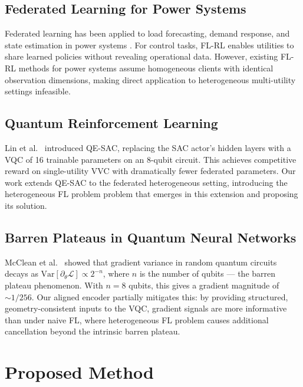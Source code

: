 \documentclass[journal]{IEEEtran}
\begin{document}
\subsection{Federated Learning for Power Systems}

Federated learning has been applied to load forecasting, demand response,
and state estimation in power systems \cite{fedpower2022}.
For control tasks, FL-RL enables utilities to share learned policies without
revealing operational data. However, existing FL-RL methods for power systems
assume homogeneous clients with identical observation dimensions, making
direct application to heterogeneous multi-utility settings infeasible.

\subsection{Quantum Reinforcement Learning}

Lin et al.\ \cite{lin2025qesac} introduced QE-SAC, replacing the SAC actor's
hidden layers with a VQC of 16 trainable parameters on an 8-qubit circuit.
This achieves competitive reward on single-utility VVC with dramatically
fewer federated parameters. Our work extends QE-SAC to the federated
heterogeneous setting, introducing the heterogeneous FL problem problem that emerges in this
extension and proposing its solution.

\subsection{Barren Plateaus in Quantum Neural Networks}

McClean et al.\ \cite{mcclean2018barren} showed that gradient variance in
random quantum circuits decays as $\text{Var}[\partial_\theta \mathcal{L}]
\propto 2^{-n}$, where $n$ is the number of qubits --- the barren plateau
phenomenon. With $n=8$ qubits, this gives a gradient magnitude of $\sim 1/256$.
Our aligned encoder partially mitigates this: by providing structured,
geometry-consistent inputs to the VQC, gradient signals are more informative
than under naive FL, where heterogeneous FL problem causes additional cancellation beyond the
intrinsic barren plateau.

\section{Proposed Method}
\label{sec:method}
\end{document}
